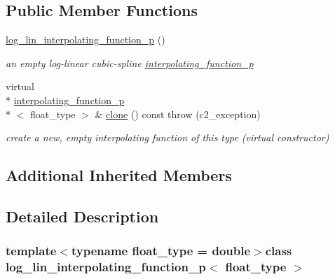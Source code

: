 \subsection*{Public Member Functions}
\begin{DoxyCompactItemize}
\item 
\hypertarget{classlog__lin__interpolating__function__p_a7275a4e792cb3895f43d84a74b03116f}{\hyperlink{classlog__lin__interpolating__function__p_a7275a4e792cb3895f43d84a74b03116f}{log\-\_\-lin\-\_\-interpolating\-\_\-function\-\_\-p} ()}\label{classlog__lin__interpolating__function__p_a7275a4e792cb3895f43d84a74b03116f}

\begin{DoxyCompactList}\small\item\em an empty log-\/linear cubic-\/spline \hyperlink{classinterpolating__function__p}{interpolating\-\_\-function\-\_\-p} \end{DoxyCompactList}\item 
\hypertarget{classlog__lin__interpolating__function__p_af1c28001b280a053e9b2bdaa9fed8da6}{virtual \\*
\hyperlink{classinterpolating__function__p}{interpolating\-\_\-function\-\_\-p}\\*
$<$ float\-\_\-type $>$ \& \hyperlink{classlog__lin__interpolating__function__p_af1c28001b280a053e9b2bdaa9fed8da6}{clone} () const   throw (c2\-\_\-exception)}\label{classlog__lin__interpolating__function__p_af1c28001b280a053e9b2bdaa9fed8da6}

\begin{DoxyCompactList}\small\item\em create a new, empty interpolating function of this type (virtual constructor) \end{DoxyCompactList}\end{DoxyCompactItemize}
\subsection*{Additional Inherited Members}


\subsection{Detailed Description}
\subsubsection*{template$<$typename float\-\_\-type = double$>$class log\-\_\-lin\-\_\-interpolating\-\_\-function\-\_\-p$<$ float\-\_\-type $>$}

